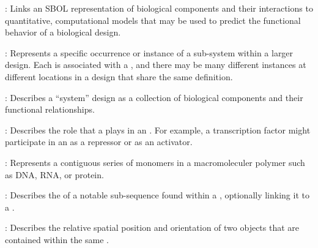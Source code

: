 \begin{description}
\item \emph{}:
Links an SBOL representation of biological components and their interactions to quantitative, computational models that may be used to predict the functional behavior of a biological design.

\item \emph{}:
Represents a specific occurrence or instance of a sub-system within a larger design.
Each  is associated with a , and there may be many different instances at different locations in a design that share the same definition.

\item \emph{}:
Describes a ``system'' design as a collection of biological components and their functional relationships.

\item \emph{}:
Describes the role that a  plays in an .
For example, a transcription factor might participate in an  as a repressor or as an activator.

\item \emph{}:
Represents a contiguous series of monomers in a macromoleculer polymer such as DNA, RNA, or protein. 

\item \emph{}:
Describes the  of a notable sub-sequence found within a , optionally linking it to a .

\item \emph{}:
Describes the relative spatial position and orientation of two  objects that are contained within the same .

\end{description}